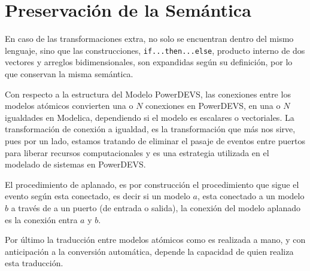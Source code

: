 \section{Preservación de la Semántica}

	En caso de las transformaciones extra, no solo se encuentran dentro del mismo lenguaje, sino que las construcciones, \texttt{if...then...else}, 
		producto interno de dos vectores y arreglos bidimensionales, son expandidas según su definición, por lo que conservan la misma semántica.

	Con respecto a la estructura del Modelo PowerDEVS, las conexiones entre los modelos atómicos convierten una o $N$ conexiones en PowerDEVS, en una o $N$
	 igualdades en Modelica, dependiendo si el modelo es escalares o vectoriales. La transformación de conexión a igualdad, es la transformación que más 
	nos sirve, pues por un lado, estamos tratando de eliminar el pasaje de eventos entre puertos para liberar recursos computacionales y
	es una estrategia utilizada en el modelado de sistemas en PowerDEVS.

	El procedimiento de aplanado, es por construcción el procedimiento que sigue el evento según esta conectado, es decir si un modelo $a$, esta conectado
	a un modelo $b$ a través de a un puerto (de entrada o salida), la conexión del modelo aplanado es la conexión entra $a$ y $b$. 

	Por último la traducción entre modelos atómicos como es realizada a mano, y con anticipación a la conversión automática, depende la capacidad de 
	quien realiza esta traducción.
